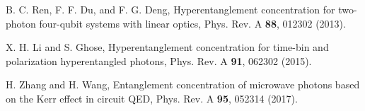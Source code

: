 \documentclass[showpacs,aps,graphicx,twocolumn]{revtex4}
\begin{document}
\begin{thebibliography}{1}
 B. C. Ren, F. F. Du, and F. G. Deng,
Hyperentanglement concentration for two-photon four-qubit systems with
linear optics, Phys. Rev. A \textbf{88}, 012302 (2013).


%









 X. H. Li and S. Ghose,
Hyperentanglement concentration for time-bin and polarization hyperentangled photons,
Phys. Rev. A \textbf{91}, 062302 (2015).






%
%
%

%



 H. Zhang and H. Wang,
Entanglement concentration of microwave photons based on the Kerr effect in circuit QED,
Phys. Rev. A \textbf{95}, 052314 (2017).











\end{thebibliography}
\end{document}
